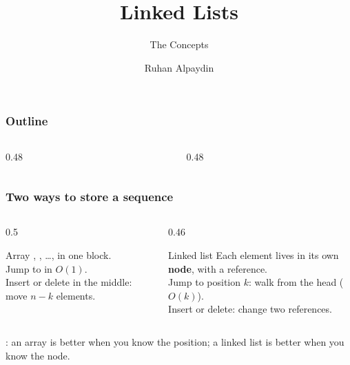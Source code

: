 \documentclass[aspectratio=169,10pt,compress]{beamer}
\title{Linked Lists}
\subtitle{The Concepts}
\author[Alpaydin]{Ruhan Alpaydin}
\institute[FCIS]{Faculty of Computer and Information Sciences\\Yeditepe University}
\date{{\tiny \hbTimeStamp}}
\begin{document}
\begin{frame}[t,fragile]\titlepage\end{frame}

\begin{frame}[t,fragile]\frametitle{Outline}
  \begin{columns}[T]
    \begin{column}{0.48\textwidth}\tableofcontents[sections={1-3},hideallsubsections]\end{column}
    \begin{column}{0.48\textwidth}\tableofcontents[sections={4-5},hideallsubsections]\end{column}
  \end{columns}
\end{frame}


\begin{frame}[t,fragile]\frametitle{Two ways to store a sequence}
  \begin{columns}[T]
    \begin{column}{0.5\textwidth}
      \begin{block}{Array}
        \small
        , , \dots,  in one block.\\
        Jump to  in $O(1)$.\\
        Insert or delete in the middle: move $n-k$ elements.
      \end{block}
    \end{column}
    \begin{column}{0.46\textwidth}
      \begin{block}{Linked list}
        \small
        Each element lives in its own \textbf{node}, with a
         reference.\\
        Jump to position $k$: walk from the head ($O(k)$).\\
        Insert or delete: change two references.
      \end{block}
    \end{column}
  \end{columns}
  \vspace{0.4em}
  \small
  : an array is better when you know the
  position; a linked list is better when you know the node.
\end{frame}
\end{document}
